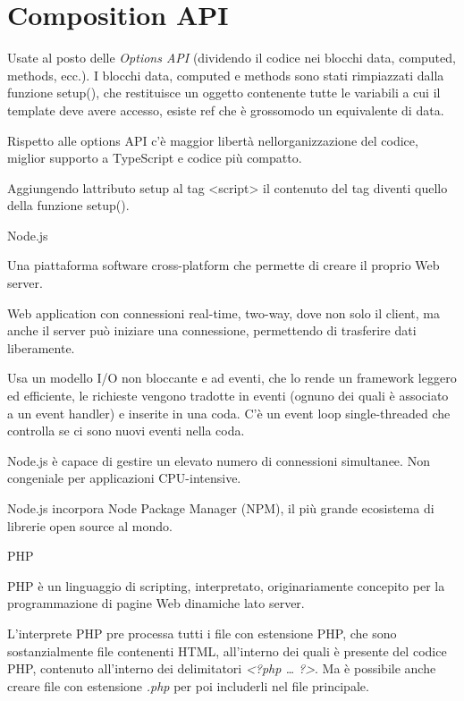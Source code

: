 \section{Composition API}\label{composition-api}

Usate al posto delle \emph{Options API} (dividendo il codice nei blocchi
data, computed, methods, ecc.). I blocchi data, computed e methods sono
stati rimpiazzati dalla funzione setup(), che restituisce un oggetto
contenente tutte le variabili a cui il template deve avere accesso,
esiste ref che è grossomodo un equivalente di data.

Rispetto alle options API c'è maggior libertà
nell\textquotesingle organizzazione del codice, miglior supporto a
TypeScript e codice più compatto.

Aggiungendo l\textquotesingle attributo setup al tag
\textless script\textgreater{} il contenuto del tag diventi quello della
funzione setup().

Node.js

Una piattaforma software cross-platform che permette di creare il
proprio Web server.

Web application con connessioni real-time, two-way, dove non solo il
client, ma anche il server può iniziare una connessione, permettendo di
trasferire dati liberamente.

Usa un modello I/O non bloccante e ad eventi, che lo rende un framework
leggero ed efficiente, le richieste vengono tradotte in eventi (ognuno
dei quali è associato a un event handler) e inserite in una coda. C'è un
event loop single-threaded che controlla se ci sono nuovi eventi nella
coda.

Node.js è capace di gestire un elevato numero di connessioni simultanee.
Non congeniale per applicazioni CPU-intensive.

Node.js incorpora Node Package Manager (NPM), il più grande ecosistema
di librerie open source al mondo.

PHP

PHP è un linguaggio di scripting, interpretato, originariamente
concepito per la programmazione di pagine Web dinamiche lato server.

L'interprete PHP pre processa tutti i file con estensione PHP, che sono
sostanzialmente file contenenti HTML, all'interno dei quali è presente
del codice PHP, contenuto all'interno dei delimitatori
\emph{\textless?php \ldots{} ?\textgreater{}}. Ma è possibile anche
creare file con estensione \emph{.php} per poi includerli nel file
principale.

